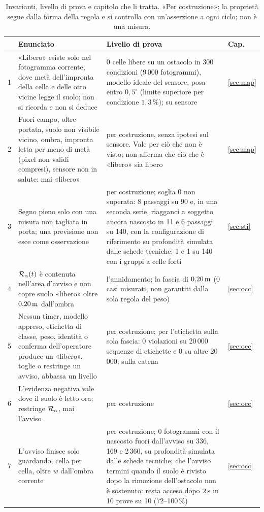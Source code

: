 \begin{table}[H]\centering\footnotesize
\caption{Invarianti, livello di prova e capitolo che li tratta. «Per costruzione»: la proprietà segue dalla forma della regola e si controlla con un'asserzione a ogni ciclo; non è una misura.}\label{tab:lim-invarianti}
\begin{tabularx}{\linewidth}{@{}rLLp{1.1cm}@{}}
\toprule
 & Enunciato & Livello di prova & Cap.\\
 & «Libero» esiste solo nel fotogramma corrente, dove metà dell'impronta della cella e delle otto vicine legge il suolo; non si ricorda e non si deduce &  0 celle libere su un ostacolo in 300 condizioni (9\,000 fotogrammi), modello ideale del sensore, posa entro $0{,}5^\circ$ (limite superiore per condizione $1{,}3\,\%$);  su sensore & \ref{sec:map}\\
2 & Fuori campo, oltre portata, suolo non visibile vicino, ombra, impronta letta per meno di metà (pixel non validi compresi), sensore non in salute: mai «libero» &  per costruzione, senza ipotesi sul sensore. Vale per ciò che non è visto; non afferma che ciò che è «libero» sia libero & \ref{sec:map}\\
3 & Segno pieno solo con una misura non tagliata in porta; una previsione non esce come osservazione & per costruzione; soglia 0 non superata: 8 passaggi su 90 e, in una seconda serie, riagganci a soggetto ancora nascosto in 11 e 6 passaggi su 140, con la configurazione di riferimento su profondità simulata dalle schede tecniche; 1 e 1 su 140 con i gruppi a celle forti  & \ref{sec:sti}\\
4 & $\mathcal{R}_\alpha(t)$ è contenuta nell'area d'avviso e non copre suolo «libero» oltre $0{,}20\,\mathrm{m}$ dall'ombra &  l'annidamento;  la fascia di $0{,}20\,\mathrm{m}$ (0 casi misurati, non garantiti dalla sola regola del peso) & \ref{sec:occ}\\
5 & Nessun timer, modello appreso, etichetta di classe, peso, identità o conferma dell'operatore produce un «libero», toglie o restringe un avviso, abbassa un livello & per costruzione; per l'etichetta  sulla sola fascia: 0 violazioni su 20\,000 sequenze di etichette e 0 su altre 20\,000;  sulla catena & \ref{sec:occ}\\
6 & L'evidenza negativa vale dove il suolo è letto ora; restringe $\mathcal{R}_\alpha$, mai l'avviso & per costruzione & \ref{sec:occ}\\
7 & L'avviso finisce solo guardando, cella per cella, oltre $w$ dall'ombra corrente & per costruzione;  0 fotogrammi con il nascosto fuori dall'avviso su 336, 169 e 2\,360, su profondità simulata dalle schede tecniche; che l'avviso termini quando il suolo è rivisto dopo la rimozione dell'ostacolo non è sostenuto: resta acceso dopo $2\,\mathrm{s}$ in 10 prove su 10 (72--100\,\%) & \ref{sec:occ}\\

\end{tabularx}
\end{table}
